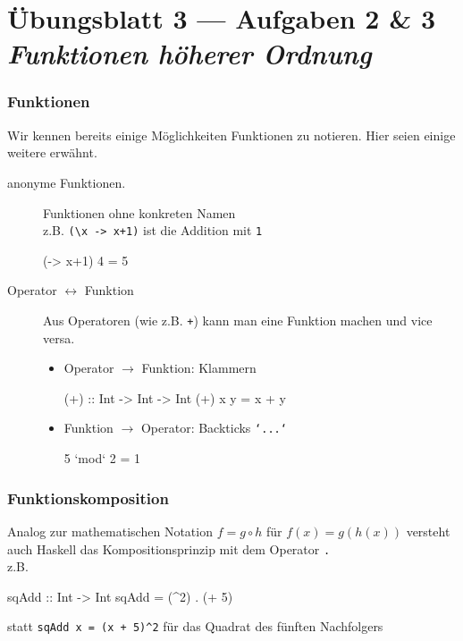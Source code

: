 \documentclass{beamer}
\begin{document}

\section{Übungsblatt 3 --- Aufgaben 2 \& 3 \\ \textit{\normalsize Funktionen höherer Ordnung}}


\begin{frame}[fragile] \frametitle{Funktionen}
	\footnotesize
	Wir kennen bereits einige Möglichkeiten Funktionen zu notieren. Hier seien einige weitere erwähnt.
	\begin{description}
		\item[anonyme Funktionen.] Funktionen ohne konkreten Namen \\
		z.B. \lstinline[basicstyle=\ttfamily\normalsize]|(\x -> x+1)| ist die Addition mit \texttt{1} 
		\begin{codebox}
(\x -> x+1) 4 = 5
		\end{codebox}
		\pause
		\item[Operator $\leftrightarrow$ Funktion] Aus Operatoren (wie z.B. \texttt{+}) kann man eine Funktion machen und vice versa.
		\begin{itemize}
			\item Operator $\to$ Funktion: Klammern
			\begin{codebox}
(+) :: Int -> Int -> Int
(+) x y =  x + y
			\end{codebox}
			\item Funktion $\to$ Operator: Backticks \texttt{`...`}
			\begin{codebox}
5 `mod` 2 = 1
			\end{codebox}
		\end{itemize}
	\end{description}
\end{frame}

\begin{frame}[fragile] \frametitle{Funktionskomposition}
	Analog zur mathematischen Notation $f = g \circ h$ für $f(x) = g(h(x))$ versteht auch Haskell das Kompositionsprinzip mit dem Operator \texttt{.} \\
	z.B. 
	\begin{codebox}
sqAdd :: Int -> Int
sqAdd = (^2) . (+ 5)
	\end{codebox} 
	statt \lstinline[basicstyle=\ttfamily\normalsize]|sqAdd x = (x + 5)^2| für das Quadrat des fünften Nachfolgers
\end{frame}
\end{document}
